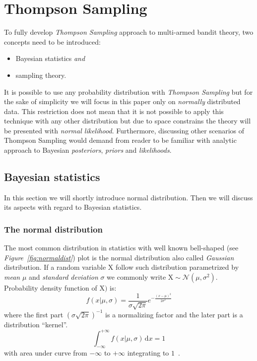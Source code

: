 \documentclass[12pt, a4paper, pdflatex, leqno]{report}
\begin{document}
\section{Thompson Sampling\label{sec:thompsonsampling}}
To fully develop \emph{Thompson Sampling} approach to multi-armed bandit theory, two concepts need to be introduced:
\begin{itemize}
\item Bayesian statistics \emph{and}
\item sampling theory.
\end{itemize}
It is possible to use any probability distribution with \emph{Thompson Sampling} but for the sake of simplicity we will focus in this paper only on \emph{normally} distributed data. This restriction does not mean that it is not possible to apply this technique with any other distribution but due to space constrains the theory will be presented with \emph{normal likelihood}. Furthermore, discussing other scenarios of Thompson Sampling would demand from reader to be familiar with analytic approach to Bayesian \emph{posteriors}, \emph{priors} and \emph{likelihoods}.

\subsection{Bayesian statistics\label{sec:bayesian}}
In this section we will shortly introduce normal distribution. Then we will discuss its aspects with regard to Bayesian statistics.

\subsubsection{The normal distribution}
The most common distribution in statistics with well known bell-shaped (see \emph{Figure~\ref{fig:normaldist}}) plot is the normal distribution also called \emph{Gaussian} distribution. If a random variable $\mathrm{X}$ follow such distribution parametrized by \emph{mean} $\mu$ and \emph{standard deviation} $\sigma$ we commonly write $\mathrm{X} \sim \mathcal{N}\left( \mu, \sigma^2 \right)$. Probability density function of $\mathrm{X})$ is:
$$
f \left(x | \mu, \sigma \right) = \frac{1}{\sigma \sqrt{2 \pi }} e^{- \frac{ {\left (  x - \mu \right )}^2 }{2 \sigma^2} }
$$
where the first part ${\left( \sigma \sqrt{2 \pi } \right)}^{-1}$ is a normalizing factor and the later part is a distribution ``kernel''.
$$
\int_{-\infty}^{+\infty} \! f \left(x | \mu, \sigma \right) \, \mathrm{d}x = 1
$$
with area under curve from $-\infty$ to $+\infty$ integrating to $1$~\citep{rice1995mathematical}.
\end{document}
